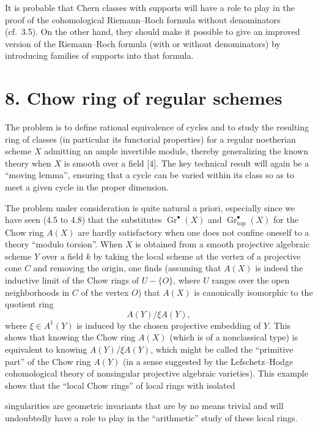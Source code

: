 \documentclass[11pt]{article}
\newcommand{\Gtop}{\operatorname{Gr}_{\mathrm{top}}}
\begin{document}
It is probable that Chern classes with supports will have a role to play in
the proof of the cohomological Riemann--Roch formula without denominators
(cf.~3.5). On the other hand, they should make it possible to give an
improved version of the Riemann--Roch formula (with or without denominators)
by introducing families of supports into that formula.

\section*{8. Chow ring of regular schemes}

The problem is to define rational equivalence of cycles and to study the
resulting ring of classes (in particular its functorial properties) for a
regular noetherian scheme $X$ admitting an ample invertible module, thereby
generalizing the known theory when $X$ is smooth over a field [4]. The key
technical result will again be a ``moving lemma'', ensuring that a cycle can
be varied within its class so as to meet a given cycle in the proper
dimension.

The problem under consideration is quite natural a priori, especially since
we have seen (4.5 to 4.8) that the substitutes
$\operatorname{Gr}^\bullet(X)$ and $\Gtop^\bullet(X)$ for the Chow ring
$A(X)$ are hardly satisfactory when one does not confine oneself to a theory
``modulo torsion''. When $X$ is obtained from a smooth projective algebraic
scheme $Y$ over a field $k$ by taking the local scheme at the vertex of a
projective cone $C$ and removing the origin, one finds (assuming that $A(X)$
is indeed the inductive limit of the Chow rings of $U-\{O\}$, where $U$
ranges over the open neighborhoods in $C$ of the vertex $O$) that $A(X)$ is
canonically isomorphic to the quotient ring
\[
 A(Y)/\xi A(Y),
\]
where $\xi\in A^1(Y)$ is induced by the chosen projective embedding of $Y$.
This shows that knowing the Chow ring $A(X)$ (which is of a nonclassical
type) is equivalent to knowing $A(Y)/\xi A(Y)$, which might be called the
``primitive part'' of the Chow ring $A(Y)$ (in a sense suggested by the
Lefschetz--Hodge cohomological theory of nonsingular projective algebraic
varieties). This example shows that the ``local Chow rings'' of local rings
with isolated

singularities are geometric invariants that are by no means trivial and will
undoubtedly have a role to play in the ``arithmetic'' study of these local
rings.
\end{document}
